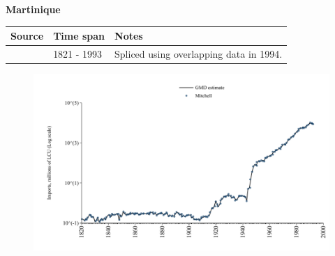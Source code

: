 \documentclass[12pt,a4paper,landscape]{article}
\begin{document}
\begin{adjustbox}{max totalsize={\paperwidth}{\paperheight},center}
\begin{minipage}[t][\textheight][t]{\textwidth}
\vspace*{0.5cm}
{}
\begin{center}
{\Large\bfseries Martinique}
\end{center}
\vspace{0.5cm}
\begin{table}[H]
\centering
\small
\begin{tabular}{|l|l|l|}
\hline
\textbf{Source} & \textbf{Time span} & \textbf{Notes} \\
\hline
\rowcolor{white}\cite{Mitchell}& 1821 - 1993 &Spliced using overlapping data in 1994.\\
\hline
\end{tabular}
\end{table}
\begin{figure}[H]
\centering
\includegraphics[width=\textwidth,height=0.6\textheight,keepaspectratio]{graphs/MTQ_imports.pdf}
\end{figure}
\end{minipage}
\end{adjustbox}
\end{document}
